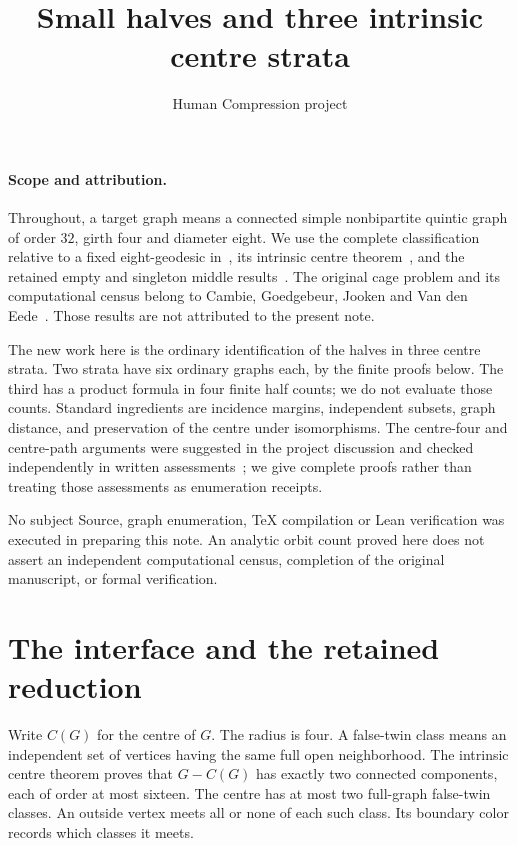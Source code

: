 \documentclass[11pt]{article}
\title{Small halves and three intrinsic centre strata}
\author{Human Compression project}
\date{}
\begin{document}
\maketitle

\paragraph{Scope and attribution.}
Throughout, a target graph means a connected simple nonbipartite quintic
graph of order $32$, girth four and diameter eight. We use the complete
classification relative to a fixed eight-geodesic in~\cite{rows}, its
intrinsic centre theorem~\cite{centre}, and the retained empty and
singleton middle results~\cite{middle}. The original cage problem and
its computational census belong to Cambie, Goedgebeur, Jooken and
Van den Eede~\cite{original}. Those results are not attributed to the
present note.

The new work here is the ordinary identification of the halves in three
centre strata. Two strata have six ordinary graphs each, by the finite
proofs below. The third has a product formula in four finite half counts;
we do not evaluate those counts. Standard ingredients are incidence
margins, independent subsets, graph distance, and preservation of the
centre under isomorphisms. The centre-four and centre-path arguments
were suggested in the project discussion and checked independently in
written assessments~\cite{assessments}; we give complete proofs rather
than treating those assessments as enumeration receipts.

No subject Source, graph enumeration, TeX compilation or Lean verification
was executed in preparing this note. An analytic orbit count proved here
does not assert an independent computational census, completion of the
original manuscript, or formal verification.

\section{The interface and the retained reduction}

Write $C(G)$ for the centre of $G$. The radius is four. A false-twin
class means an independent set of vertices having the same full open
neighborhood. The intrinsic centre theorem proves that $G-C(G)$ has
exactly two connected components, each of order at most sixteen.
The centre has at most two full-graph false-twin classes. An outside
vertex meets all or none of each such class. Its boundary color records
which classes it meets.
\end{document}
